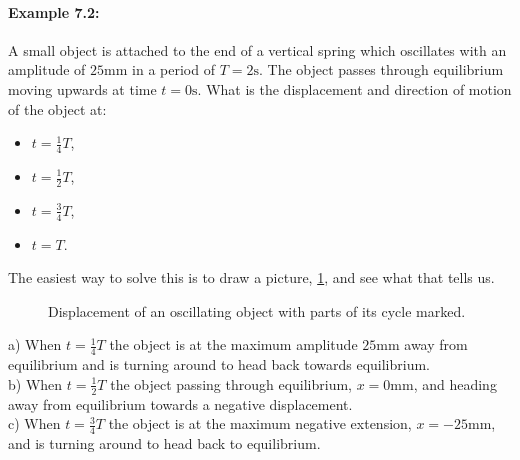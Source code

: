 \paragraph{Example 7.2:} A small object is attached to the end of a vertical spring which oscillates with an amplitude of $25\text{mm}$ in a period of $T=2\text{s}$. The object passes through equilibrium moving upwards at time $t=0\text{s}$. What is the displacement and direction of motion of the object at:
\begin{itemize}
\setlength{\itemsep}{-5pt}
    \item[a)] $t=\frac{1}{4}T$,
    \item[b)] $t=\frac{1}{2}T$,
    \item[c)] $t=\frac{3}{4}T$,
    \item[d)] $t=T$.
\end{itemize}  

The easiest way to solve this is to draw a picture, \cref{fig: shm with parts}, and see what that tells us. 
\begin{figure}[ht]
    \centering
    \caption{Displacement of an oscillating object with parts of its cycle marked. }
        \label{fig: shm with parts}
\end{figure}

a) When $t=\frac{1}{4}T$ the object is at the maximum amplitude $25\text{mm}$ away from equilibrium and is turning around to head back towards equilibrium.\\

b) When $t=\frac{1}{2}T$ the object passing through equilibrium, $x=0\text{mm}$, and heading away from equilibrium towards a negative displacement. \\

c) When $t=\frac{3}{4}T$ the object is at the maximum negative extension, $x=-25\text{mm}$, and is turning around to head back to equilibrium.\\

